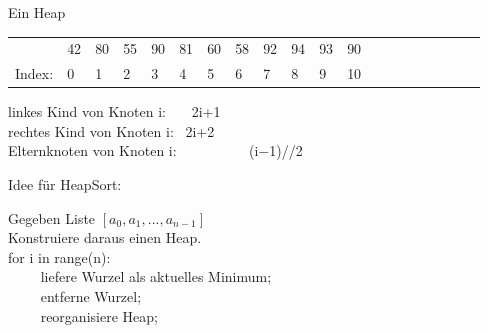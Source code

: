 \documentclass{beamer}
\begin{document}
\begin{frame}[fragile]
Ein Heap 

 \pause 

\begin{tabular}{llllllllllllllllllll}
& 42 & 80 & 55 & 90 & 81 & 60 & 58 & 92 & 94 & 93 & 90 \\
Index: & 0 & 1 & 2 & 3 & 4 & 5 & 6 & 7 & 8 & 9 & 10
\end{tabular}

linkes Kind von Knoten i: ~~~\pause 2i+1  \\
rechtes Kind von Knoten i:  ~\pause 2i+2  \\
Elternknoten von Knoten i: ~~~~~~~~~ \pause (i$-$1)//2

\end{frame}

\begin{frame}[fragile]
Idee für HeapSort: 

Gegeben Liste $[a_0, a_1, ... , a_{n-1}]$ \\ 
Konstruiere daraus einen Heap. \\ 
for i in range(n):\\  
~~~~ liefere Wurzel als aktuelles Minimum; \\  
~~~~ entferne Wurzel; \\ 
~~~~ reorganisiere Heap; \\


\end{frame}
\end{document}
